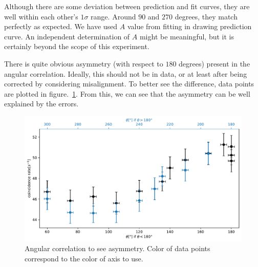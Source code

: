 Although there are some deviation between prediction and fit curves, they are well within each other's $1\sigma$ range. Around $90$ and $270$ degrees, they match perfectly as expected. We have used $A$ value from fitting in drawing prediction curve. An independent determination of $A$ might be meaningful, but it is certainly beyond the scope of this experiment.

There is quite obvious asymmetry (with respect to $180$ degrees) present in the angular correlation. Ideally, this should not be in data, or at least after being corrected by considering misalignment. To better see the difference, data points are plotted in figure.~\ref{fig:angAsymm}. From this, we can see that the asymmetry can be well explained by the errors.
\begin{figure}[ht]
   \centering
   \includegraphics[width=0.8\linewidth]{./figs/angAsymm.pdf}
   \caption{Angular correlation to see asymmetry. Color of data points correspond to the color of axis to use.}%
   \label{fig:angAsymm}
\end{figure}
